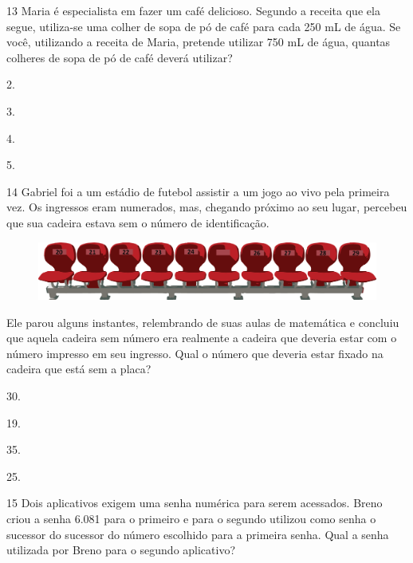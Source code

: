 \num{13} Maria é especialista em fazer um café delicioso. Segundo a receita que ela segue, utiliza-se uma colher de sopa de pó de café para cada 250 mL de água. Se você, utilizando a receita de Maria, pretende utilizar 750 mL de água, quantas colheres de sopa de pó de café deverá utilizar?

\begin{escolha}
\item
  2.
\item
  3.
\item
  4.
\item
  5.
\end{escolha}

\num{14} Gabriel foi a um estádio de futebol assistir a um jogo ao vivo pela primeira vez. Os ingressos eram numerados, mas, chegando próximo ao seu
lugar, percebeu que sua cadeira estava sem o número de identificação.

\begin{figure}[htpb!]
\centering
\includegraphics[width=\textwidth]{./media/image107.png}
\end{figure}

Ele parou alguns instantes, relembrando de suas aulas de matemática e concluiu que aquela cadeira sem número era realmente a cadeira que deveria estar com o número impresso em seu ingresso. Qual o número que
deveria estar fixado na cadeira que está sem a placa?

\begin{escolha}
\item
  30.
\item
  19.
\item
  35.
\item
  25.
\end{escolha}

\pagebreak
\num{15} Dois aplicativos exigem uma senha numérica para serem acessados. Breno criou a senha 6.081 para o primeiro e para o segundo utilizou como senha o sucessor do sucessor do número escolhido para a primeira senha. Qual a senha utilizada por Breno para o segundo aplicativo?

